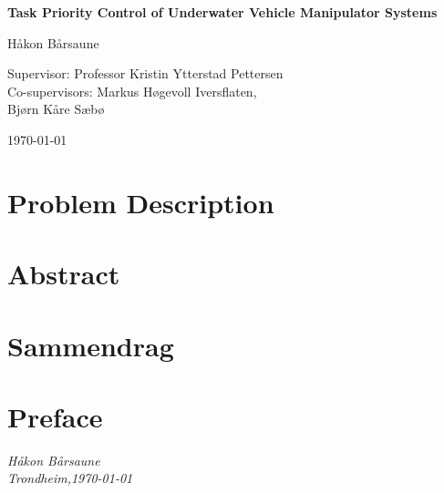\documentclass[24pt,b5paper,openright]{book}
\begin{document}
\begin{titlepage}
    \begin{center}
        \vspace*{1cm}
        \huge{\textbf{Task Priority Control of Underwater Vehicle Manipulator Systems}}
        \vspace{2cm}

        \Large{Håkon Bårsaune}
        \vspace{2cm}

        \large{
            Supervisor: Professor Kristin Ytterstad Pettersen \\
            Co-supervisors: Markus Høgevoll Iversflaten, \\
            Bjørn Kåre Sæbø %
        }

        \vspace{2cm}
        \today
        \vfill
        \begin{figure}[htbp]
            \centering
            
        \end{figure}
    \end{center}
\end{titlepage}

\clearpage
\restoregeometry 


\section*{\Huge{Problem Description}}

\newpage

\section*{\Huge{Abstract}}

\newpage

\section*{\Huge{Sammendrag}}

\newpage

\section*{\Huge{Preface}}

\begin{flushright}
    \textit{Håkon Bårsaune} \\
    \textit{Trondheim,\today}
\end{flushright}
\newpage
\end{document}
